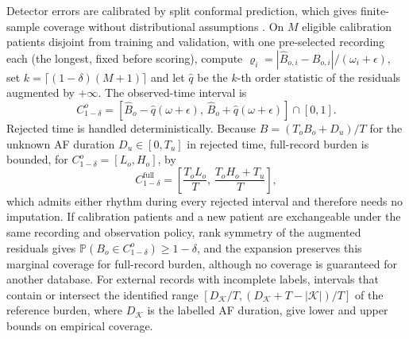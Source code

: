 \documentclass[preprint,12pt]{elsarticle}
\newcommand{\Prob}{\mathbb{P}}
\newcommand{\1}{\mathbf{1}}
\begin{document}
Detector errors are calibrated by split conformal prediction, which gives finite-sample coverage without distributional assumptions \cite{lei2018split}. On $M$ eligible calibration patients disjoint from training and validation, with one pre-selected recording each (the longest, fixed before scoring), compute $\varrho_i=|\hat B_{o,i}-B_{o,i}|/(\omega_i+\epsilon)$, set $k=\lceil(1-\delta)(M+1)\rceil$ and let $\hat q$ be the $k$-th order statistic of the residuals augmented by $+\infty$. The observed-time interval is
\begin{equation}
C^o_{1-\delta}=[\hat B_o-\hat q(\omega+\epsilon),\,
\hat B_o+\hat q(\omega+\epsilon)]\cap[0,1].
\label{eq:burdenint}
\end{equation}
Rejected time is handled deterministically. Because $B=(T_oB_o+D_u)/T$ for the unknown AF duration $D_u\in[0,T_u]$ in rejected time, full-record burden is bounded, for $C^o_{1-\delta}=[L_o,H_o]$, by
\begin{equation}
C^{\mathrm{full}}_{1-\delta}=
\left[\frac{T_oL_o}{T},\,
\frac{T_oH_o+T_u}{T}\right],
\label{eq:missingburden}
\end{equation}
which admits either rhythm during every rejected interval and therefore needs no imputation. If calibration patients and a new patient are exchangeable under the same recording and observation policy, rank symmetry of the augmented residuals \cite{lei2018split} gives $\Prob(B_o\in C^o_{1-\delta})\ge1-\delta$, and the expansion preserves this marginal coverage for full-record burden, although no coverage is guaranteed for another database. For external records with incomplete labels, intervals that contain or intersect the identified range $[D_{\mathcal K}/T,(D_{\mathcal K}+T-|\mathcal K|)/T]$ of the reference burden, where $D_{\mathcal K}$ is the labelled AF duration, give lower and upper bounds on empirical coverage.
\end{document}
